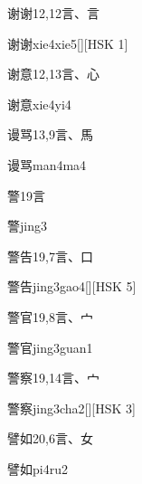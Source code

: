 \begin{entry}{谢谢}{12,12}{⾔、⾔}
  \begin{phonetics}{谢谢}{xie4xie5}[][HSK 1]
  \end{phonetics}
\end{entry}

\begin{entry}{谢意}{12,13}{⾔、⼼}
  \begin{phonetics}{谢意}{xie4yi4}
  \end{phonetics}
\end{entry}

\begin{entry}{谩骂}{13,9}{⾔、⾺}
  \begin{phonetics}{谩骂}{man4ma4}
  \end{phonetics}
\end{entry}

\begin{entry}{警}{19}{⾔}
  \begin{phonetics}{警}{jing3}
  \end{phonetics}
\end{entry}

\begin{entry}{警告}{19,7}{⾔、⼝}
  \begin{phonetics}{警告}{jing3gao4}[][HSK 5]
  \end{phonetics}
\end{entry}

\begin{entry}{警官}{19,8}{⾔、⼧}
  \begin{phonetics}{警官}{jing3guan1}
  \end{phonetics}
\end{entry}

\begin{entry}{警察}{19,14}{⾔、⼧}
  \begin{phonetics}{警察}{jing3cha2}[][HSK 3]
  \end{phonetics}
\end{entry}

\begin{entry}{譬如}{20,6}{⾔、⼥}
  \begin{phonetics}{譬如}{pi4ru2}
  \end{phonetics}
\end{entry}



